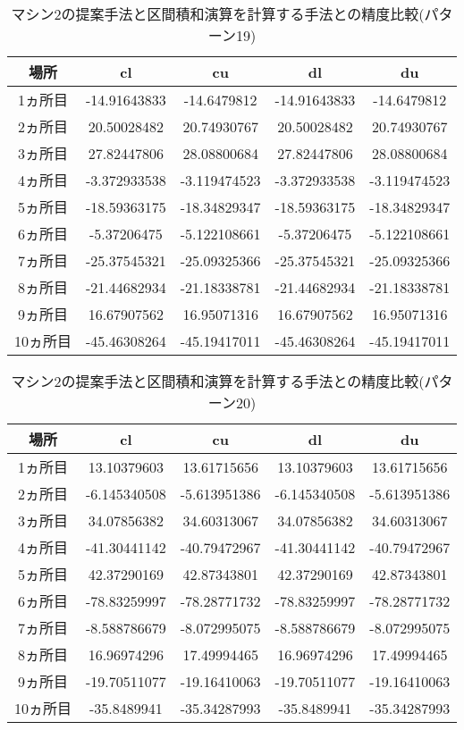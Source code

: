 \documentclass[11pt,a4paper]{jsreport}
\theoremstyle{definition}
\begin{document}
\begin{table}[H]
\centering
\begin{tabular}{|c|c|c|c|c|}
\hline
場所 & cl & cu & dl & du \\ \hline
1ヵ所目 & -14.91643833 & -14.6479812 & -14.91643833 & -14.6479812 \\ \hline
2ヵ所目 & 20.50028482 & 20.74930767 & 20.50028482 & 20.74930767 \\ \hline
3ヵ所目 & 27.82447806 & 28.08800684 & 27.82447806 & 28.08800684 \\ \hline
4ヵ所目 & -3.372933538 & -3.119474523 & -3.372933538 & -3.119474523 \\ \hline
5ヵ所目 & -18.59363175 & -18.34829347 & -18.59363175 & -18.34829347 \\ \hline
6ヵ所目 & -5.37206475 & -5.122108661 & -5.37206475 & -5.122108661 \\ \hline
7ヵ所目 & -25.37545321 & -25.09325366 & -25.37545321 & -25.09325366 \\ \hline
8ヵ所目 & -21.44682934 & -21.18338781 & -21.44682934 & -21.18338781 \\ \hline
9ヵ所目 & 16.67907562 & 16.95071316 & 16.67907562 & 16.95071316 \\ \hline
10ヵ所目 & -45.46308264 & -45.19417011 & -45.46308264 & -45.19417011 \\ \hline
\end{tabular}
\caption{マシン2の提案手法と区間積和演算を計算する手法との精度比較(パターン19)}
\end{table}

\begin{table}[H]
\centering
\begin{tabular}{|c|c|c|c|c|}
\hline
場所 & cl & cu & dl & du \\ \hline
1ヵ所目 & 13.10379603 & 13.61715656 & 13.10379603 & 13.61715656 \\ \hline
2ヵ所目 & -6.145340508 & -5.613951386 & -6.145340508 & -5.613951386 \\ \hline
3ヵ所目 & 34.07856382 & 34.60313067 & 34.07856382 & 34.60313067 \\ \hline
4ヵ所目 & -41.30441142 & -40.79472967 & -41.30441142 & -40.79472967 \\ \hline
5ヵ所目 & 42.37290169 & 42.87343801 & 42.37290169 & 42.87343801 \\ \hline
6ヵ所目 & -78.83259997 & -78.28771732 & -78.83259997 & -78.28771732 \\ \hline
7ヵ所目 & -8.588786679 & -8.072995075 & -8.588786679 & -8.072995075 \\ \hline
8ヵ所目 & 16.96974296 & 17.49994465 & 16.96974296 & 17.49994465 \\ \hline
9ヵ所目 & -19.70511077 & -19.16410063 & -19.70511077 & -19.16410063 \\ \hline
10ヵ所目 & -35.8489941 & -35.34287993 & -35.8489941 & -35.34287993 \\ \hline
\end{tabular}
\caption{マシン2の提案手法と区間積和演算を計算する手法との精度比較(パターン20)}
\end{table}
\end{document}
